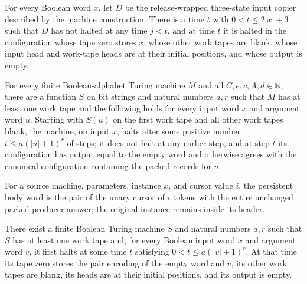 \begin{lemma}
\label{Complexity.clA5Copy_clean}
\leanok
{}
For every Boolean word $x$, let $D$ be the release-wrapped three-state input copier
described by the machine construction. There is a time $t$ with $0<t\le 2|x|+3$ such
that $D$ has not halted at any time $j<t$, and at time $t$ it is halted in the
configuration whose tape zero stores $x$, whose other work tapes are blank, whose input
head and work-tape heads are at their initial positions, and whose output is empty.
\end{lemma}

\begin{lemma}
\label{Complexity.clA5Packed_install}
\leanok
{}
For every finite Boolean-alphabet Turing machine $M$ and all $C,e,c,A,d\in\mathbb{N}$,
there are a function $S$ on bit strings and natural numbers $a,r$ such that $M$ has at
least one work tape and the following holds for every input word $x$ and argument word
$u$. Starting with $S(u)$ on the first work tape and all other work tapes blank, the
machine, on input $x$, halts after some positive number $t\le a(|u|+1)^r$ of steps; it
does not halt at any earlier step, and at step $t$ its configuration has output equal to
the empty word and otherwise agrees with the canonical configuration containing the
packed records for $u$.
\end{lemma}

\begin{definition}
\label{Complexity.clA5Pack}
\leanok
{}
For a source machine, parameters, instance $x$, and cursor value $i$, the persistent body word is the pair of the unary cursor of $i$ tokens with the entire unchanged packed producer answer; the original instance remains inside its header.
\end{definition}

\begin{lemma}
\label{Complexity.clA5Cursor_install}
\leanok
{}
There exist a finite Boolean Turing machine $S$ and natural numbers $a,r$ such that $S$
has at least one work tape and, for every Boolean input word $x$ and argument word $v$,
it first halts at some time $t$ satisfying $0<t\le a(|v|+1)^r$. At that time its tape
zero stores the pair encoding of the empty word and $v$, its other work tapes are blank,
its heads are at their initial positions, and its output is empty.
\end{lemma}

